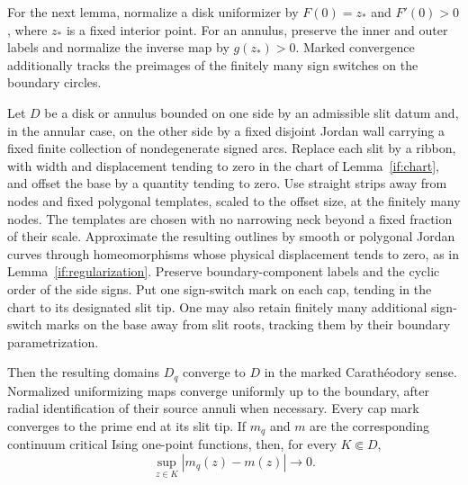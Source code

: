 For the next lemma, normalize a disk uniformizer by $F(0)=z_*$ and
$F'(0)>0$, where $z_*$ is a fixed interior point. For an annulus,
preserve the inner and outer labels and normalize the inverse map by
$g(z_*)>0$. Marked convergence additionally tracks the preimages of
the finitely many sign switches on the boundary circles.

\begin{lemma}
\label{if:marked-convergence}
Let $D$ be a disk or annulus bounded on one side by an admissible slit
datum and, in the annular case, on the other side by a fixed disjoint
Jordan wall carrying a fixed finite collection of nondegenerate signed
arcs.  Replace each slit by a ribbon, with width and displacement
tending to zero in the chart of Lemma~\ref{if:chart}, and offset the
base by a quantity tending to zero.  Use straight strips away from
nodes and fixed polygonal templates, scaled to the offset size, at
the finitely many nodes.  The templates are chosen with no narrowing
neck beyond a fixed fraction of their scale.  Approximate the resulting
outlines by smooth or polygonal Jordan curves through homeomorphisms
whose physical displacement tends to zero, as in
Lemma~\ref{if:regularization}.  Preserve boundary-component
labels and the cyclic order of the side signs.  Put one sign-switch
mark on each cap, tending in the chart to its designated slit tip.
One may also retain finitely many additional sign-switch marks on
the base away from slit roots, tracking them by their boundary
parametrization.

Then the resulting domains $D_q$ converge to $D$ in the marked
Carath\'eodory sense.  Normalized uniformizing maps converge uniformly
up to the boundary, after radial identification of their source annuli
when necessary.  Every cap mark converges to the prime end at its slit
tip.  If $m_q$ and $m$ are the corresponding continuum critical Ising
one-point functions, then, for every $K\Subset D$,
\begin{equation}\label{if:mean-continuity}
       \sup_{z\in K}|m_q(z)-m(z)|\longrightarrow0.
\end{equation}
\end{lemma}

